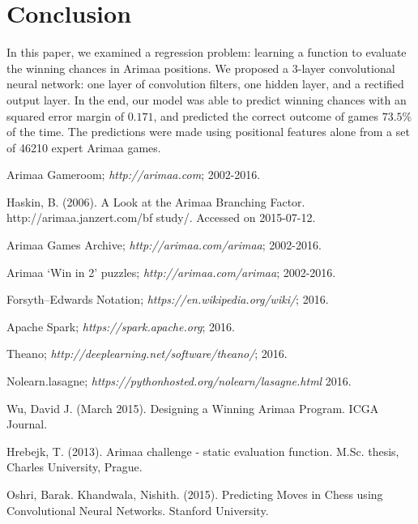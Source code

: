 \documentclass{article}
\begin{document}
\section{Conclusion}

In this paper, we examined a regression problem: learning a function to evaluate the winning chances in Arimaa positions.  We proposed a 3-layer convolutional neural network: one layer of convolution filters, one hidden layer, and a rectified output layer.  In the end, our model was able to predict winning chances with an squared error margin of $0.171$, and predicted the correct outcome of games $73.5\%$ of the time.  The predictions were made using positional features alone from a set of 46210 expert Arimaa games.

\begin{thebibliography}{9}

Arimaa Gameroom;
\textit{http://arimaa.com};
2002-2016.

Haskin, B. (2006). A Look at the Arimaa Branching Factor. http://arimaa.janzert.com/bf study/. Accessed on 2015-07-12.

Arimaa Games Archive;
\textit{http://arimaa.com/arimaa};
2002-2016.

Arimaa `Win in 2' puzzles;
\textit{http://arimaa.com/arimaa};
2002-2016.

Forsyth--Edwards Notation;
\textit{https://en.wikipedia.org/wiki/};
2016.

Apache Spark;
\textit{https://spark.apache.org};
2016.

Theano;
\textit{http://deeplearning.net/software/theano/};
2016.

Nolearn.lasagne;
\textit{https://pythonhosted.org/nolearn/lasagne.html}
2016.

Wu, David J. (March 2015).
Designing a Winning Arimaa Program.
ICGA Journal.

Hrebejk, T. (2013). Arimaa challenge - static evaluation function. M.Sc. thesis, Charles University, Prague.

Oshri, Barak. Khandwala, Nishith. (2015).  Predicting Moves in Chess using Convolutional Neural Networks.  Stanford University.

\end{thebibliography}
\end{document}
